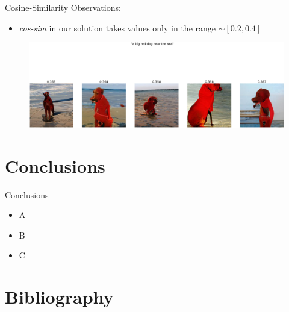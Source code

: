 \documentclass[t]{beamer}
\begin{document}
\begin{frame}{Cosine-Similarity}
Observations:
\begin{itemize}
\item \textit{cos-sim} in our solution takes values only in the range $\sim [0.2, 0.4]$
\end{itemize}
\begin{figure}
    \centering
    \includegraphics[scale=0.05]{bigreddog.png}
\end{figure} 
\end{frame}

\section{Conclusions}

\begin{frame}[c]{Conclusions}
\begin{itemize}
\item A
\item B
\item C
\end{itemize}
\end{frame}

\section{Bibliography}
\end{document}
